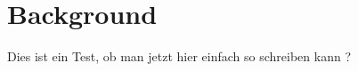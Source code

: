 
\chapter{Background}
\label{chapter:Background}
Dies ist ein Test, ob man jetzt hier einfach so schreiben kann \cite{vielleicht:daher}?